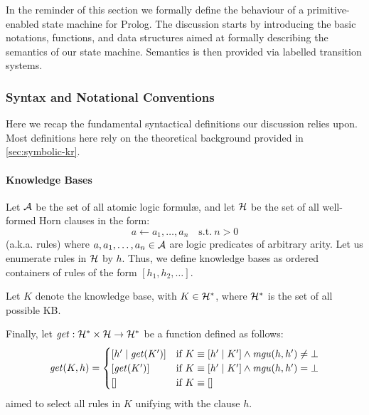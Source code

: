 \documentclass[12pt,a4paper,openright,twoside]{book}
\begin{document}
In the reminder of this section we formally define the behaviour of a primitive-enabled state machine for Prolog.
%
The discussion starts by introducing the basic notations, functions, and data structures aimed at formally describing the semantics of our state machine.
%
Semantics is then provided via labelled transition systems.

\subsubsection{Syntax and Notational Conventions}

Here we recap the fundamental syntactical definitions our discussion relies upon.
%
Most definitions here rely on the theoretical background provided in \cref{sec:symbolic-kr}.

\paragraph{Knowledge Bases}

Let $\mathcal{A}$ be the set of all atomic logic formul\ae, and let $\mathcal{H}$ be the set of all well-formed Horn clauses in the form:
%
\[ a \leftarrow a_1, \ldots, a_n \quad \text{s.t.} \ n > 0\]
%
(a.k.a. rules) where $a, a_1, \ldots, a_n \in \mathcal{A}$ are logic predicates of arbitrary arity.
%
Let us enumerate rules in $\mathcal{H}$ by $h$.
%
Thus, we define knowledge bases as ordered containers of rules of the form $[h_1, h_2, \ldots]$.

Let $K$ denote the knowledge base, with $K \in \mathcal{H}^* $, where $\mathcal{H}^*$ is the set of all possible KB.

Finally, let $ \mathit{get} : \mathcal{H}^* \times \mathcal{H} \rightarrow \mathcal{H}^* $ be a function defined as follows:
%
\[ \fx{get}{K, h} = \begin{cases}
    [h' \mid \fx{get}{K'}] & \text{if}\ K \equiv [h' \mid K'] \wedge \fx{mgu}{h, h'} \neq \bot \\
    [\fx{get}{K'}] & \text{if}\ K \equiv [h' \mid K'] \wedge \fx{mgu}{h, h'} = \bot \\
    [] & \text{if}\ K \equiv []
\end{cases} \]
%
aimed to select all rules in $K$ unifying with the clause $h$.
\end{document}
